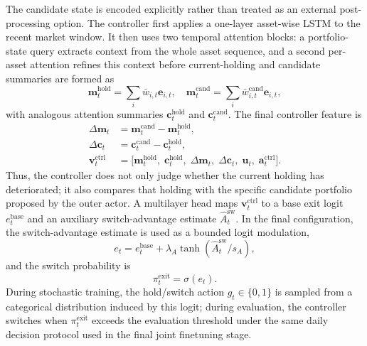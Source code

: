 \documentclass[letterpaper]{article} %
\begin{document}
The candidate state is encoded explicitly rather than treated as an external post-processing option. The controller first applies a one-layer asset-wise LSTM to the recent market window. It then uses two temporal attention blocks: a portfolio-state query extracts context from the whole asset sequence, and a second per-asset attention refines this context before current-holding and candidate summaries are formed as
\[
\mathbf{m}^{\mathrm{hold}}_t=\sum_i \bar{w}_{i,t}\mathbf{e}_{i,t},
\quad
\mathbf{m}^{\mathrm{cand}}_t=\sum_i \bar{w}_{i,t}^{\mathrm{cand}}\mathbf{e}_{i,t},
\]
with analogous attention summaries \(\mathbf{c}^{\mathrm{hold}}_t\) and \(\mathbf{c}^{\mathrm{cand}}_t\). The final controller feature is
\[
\begin{aligned}
\Delta\mathbf{m}_t&=\mathbf{m}^{\mathrm{cand}}_t-\mathbf{m}^{\mathrm{hold}}_t,\\
\Delta\mathbf{c}_t&=\mathbf{c}^{\mathrm{cand}}_t-\mathbf{c}^{\mathrm{hold}}_t,\\
\mathbf{v}^{\mathrm{ctrl}}_t
&=
\bigl[
\mathbf{m}^{\mathrm{hold}}_t,\;
\mathbf{c}^{\mathrm{hold}}_t,\;
\Delta\mathbf{m}_t,\;
\Delta\mathbf{c}_t,\;
\mathbf{u}_t,\;
\mathbf{a}^{\mathrm{ctrl}}_t
\bigr].
\end{aligned}
\]
Thus, the controller does not only judge whether the current holding has deteriorated; it also compares that holding with the specific candidate portfolio proposed by the outer actor. A multilayer head maps \(\mathbf{v}^{\mathrm{ctrl}}_t\) to a base exit logit \(e_t^{\mathrm{base}}\) and an auxiliary switch-advantage estimate \(\widehat{A}^{\mathrm{sw}}_t\). In the final configuration, the switch-advantage estimate is used as a bounded logit modulation,
\[
e_t
=
e_t^{\mathrm{base}}
+\lambda_A\tanh(\widehat{A}^{\mathrm{sw}}_t/s_A),
\]
and the switch probability is
\[
\pi_t^{\mathrm{exit}}=\sigma(e_t).
\]
During stochastic training, the hold/switch action \(g_t\in\{0,1\}\) is sampled from a categorical distribution induced by this logit; during evaluation, the controller switches when \(\pi_t^{\mathrm{exit}}\) exceeds the evaluation threshold under the same daily decision protocol used in the final joint finetuning stage.
\end{document}
